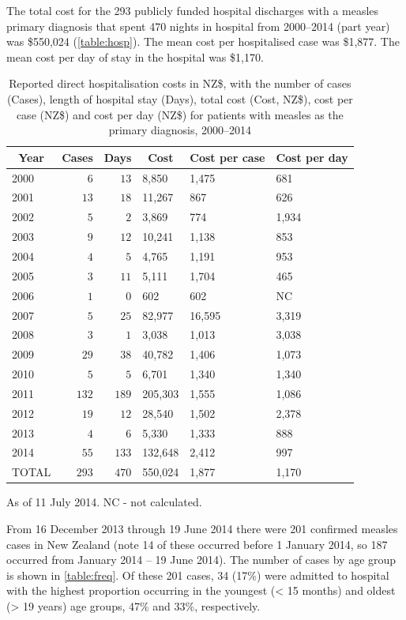 \documentclass{article}
\begin{document}
The total cost for the 293 publicly funded hospital discharges with a measles primary diagnosis that spent 470 nights in hospital from 2000--2014 (part year) was \$550,024 (\autoref{table:hosp}). The mean cost per hospitalised case was \$1,877. The mean cost per day of stay in the hospital was \$1,170.

\begin{table}
\begin{center}
\begin{tabular}{lrrlll}
\hline\hline
\multicolumn{1}{c}{Year}&\multicolumn{1}{c}{Cases}&\multicolumn{1}{c}{Days}&\multicolumn{1}{c}{Cost}&\multicolumn{1}{c}{Cost per case}&\multicolumn{1}{c}{Cost per day}\tabularnewline
\hline
2000&$  6$&$ 13$&8,850&1,475&681\tabularnewline
2001&$ 13$&$ 18$&11,267&867&626\tabularnewline
2002&$  5$&$  2$&3,869&774&1,934\tabularnewline
2003&$  9$&$ 12$&10,241&1,138&853\tabularnewline
2004&$  4$&$  5$&4,765&1,191&953\tabularnewline
2005&$  3$&$ 11$&5,111&1,704&465\tabularnewline
2006&$  1$&$  0$&602&602&NC\tabularnewline
2007&$  5$&$ 25$&82,977&16,595&3,319\tabularnewline
2008&$  3$&$  1$&3,038&1,013&3,038\tabularnewline
2009&$ 29$&$ 38$&40,782&1,406&1,073\tabularnewline
2010&$  5$&$  5$&6,701&1,340&1,340\tabularnewline
2011&$132$&$189$&205,303&1,555&1,086\tabularnewline
2012&$ 19$&$ 12$&28,540&1,502&2,378\tabularnewline
2013&$  4$&$  6$&5,330&1,333&888\tabularnewline
2014&$ 55$&$133$&132,648&2,412&997\tabularnewline
TOTAL&$293$&$470$&550,024&1,877&1,170\tabularnewline
\hline
\end{tabular}\end{center}\caption{Reported direct hospitalisation costs in NZ\$, with the number of cases (Cases), length of hospital stay (Days), total cost (Cost, NZ\$), cost per case (NZ\$) and cost per day (NZ\$) for patients with measles as the primary diagnosis, 2000--2014}
\label{table:hosp}
 \centering
 \begin{tablenotes}
      \small
      \item As of 11 July 2014. NC - not calculated.
    \end{tablenotes}
\end{table}

From 16 December 2013 through 19 June 2014 there were 201 confirmed measles cases in New Zealand (note 14 of these occurred before 1 January 2014, so 187 occurred from January 2014 -- 19 June 2014). The number of cases by age group is shown in \autoref{table:freq}. Of these 201 cases, 34 (17\%) were admitted to hospital with the highest proportion occurring in the youngest (< 15 months) and oldest (> 19 years) age groups, 47\% and 33\%, respectively.
\end{document}
